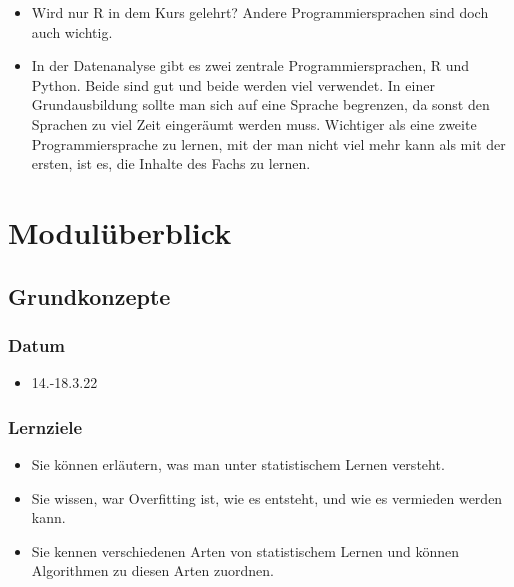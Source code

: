 \documentclass[
]{book}
\providecommand{\tightlist}{%
  \setlength{\itemsep}{0pt}\setlength{\parskip}{0pt}}
\begin{document}
\begin{itemize}
  \begin{itemize}
  \tightlist
  \item
    Wird nur R in dem Kurs gelehrt? Andere Programmiersprachen sind doch auch wichtig.
  \item
    In der Datenanalyse gibt es zwei zentrale Programmiersprachen, R und Python. Beide sind gut und beide werden viel verwendet. In einer Grundausbildung sollte man sich auf eine Sprache begrenzen, da sonst den Sprachen zu viel Zeit eingeräumt werden muss. Wichtiger als eine zweite Programmiersprache zu lernen, mit der man nicht viel mehr kann als mit der ersten, ist es, die Inhalte des Fachs zu lernen.
  \end{itemize}
\end{itemize}

\hypertarget{moduluxfcberblick}{%
\chapter{Modulüberblick}\label{moduluxfcberblick}}

\hypertarget{grundkonzepte}{%
\section{Grundkonzepte}\label{grundkonzepte}}

\hypertarget{datum}{%
\subsection{Datum}\label{datum}}

\begin{itemize}
\tightlist
\item
  14.-18.3.22
\end{itemize}

\hypertarget{lernziele-1}{%
\subsection{Lernziele}\label{lernziele-1}}

\begin{itemize}
\tightlist
\item
  Sie können erläutern, was man unter statistischem Lernen versteht.
\item
  Sie wissen, war Overfitting ist, wie es entsteht, und wie es vermieden werden kann.
\item
  Sie kennen verschiedenen Arten von statistischem Lernen und können Algorithmen zu diesen Arten zuordnen.
\end{itemize}
\end{document}
